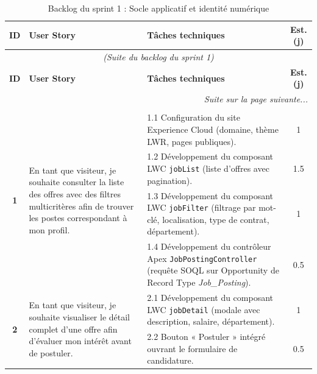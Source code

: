 \begin{longtable}{|c|p{5.5cm}|p{6cm}|c|}
\caption{Backlog du sprint 1 : Socle applicatif et identité numérique} \label{tab:Backlog_sprint1} \\
\hline
\rowcolor{gray!20} \textbf{ID} & \textbf{User Story} & \textbf{Tâches techniques} & \textbf{Est. (j)} \\
\hline
\endfirsthead

\multicolumn{4}{c}{\textit{(Suite du backlog du sprint 1)}} \\
\hline
\rowcolor{gray!20} \textbf{ID} & \textbf{User Story} & \textbf{Tâches techniques} & \textbf{Est. (j)} \\
\hline
\endhead

\hline \multicolumn{4}{r}{\textit{Suite sur la page suivante...}} \\
\endfoot

\hline
\endlastfoot

\multicolumn{4}{|c|}{\cellcolor{blue!8}\textbf{Portail public --- Vitrine de recrutement}} \\
\hline

\multirow{4}{*}{\textbf{1}} & \multirow{4}{5.5cm}{En tant que visiteur, je souhaite consulter la liste des offres avec des filtres multicritères afin de trouver les postes correspondant à mon profil.} & 1.1 Configuration du site Experience Cloud (domaine, thème LWR, pages publiques). & 1 \\
\cline{3-4}
& & 1.2 Développement du composant LWC \texttt{jobList} (liste d'offres avec pagination). & 1.5 \\
\cline{3-4}
& & 1.3 Développement du composant LWC \texttt{jobFilter} (filtrage par mot-clé, localisation, type de contrat, département). & 1 \\
\cline{3-4}
& & 1.4 Développement du contrôleur Apex \texttt{JobPostingController} (requête SOQL sur Opportunity de Record Type \textit{Job\_Posting}). & 0.5 \\

\hline

\multirow{2}{*}{\textbf{2}} & \multirow{2}{5.5cm}{En tant que visiteur, je souhaite visualiser le détail complet d'une offre afin d'évaluer mon intérêt avant de postuler.} & 2.1 Développement du composant LWC \texttt{jobDetail} (modale avec description, salaire, département). & 1 \\
\cline{3-4}
& & 2.2 Bouton « Postuler » intégré ouvrant le formulaire de candidature. & 0.5 \\


\end{longtable}
